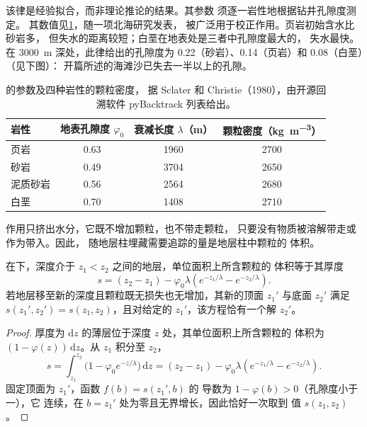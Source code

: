 该律是经验拟合，而非理论推论的结果。其参数
须逐一岩性地根据钻井孔隙度测定。
其数值见\cref{tab:b1:diagenesis-basins:athy}，随一项北海研究发表，
被广泛用于校正作用。页岩初始含水比砂岩多，
但失水的距离较短；白垩在地表处是三者中孔隙度最大的，
失水最快。在 \qty{3000}{m} 深处，此律给出的孔隙度为
\num{0.22}（砂岩）、\num{0.14}（页岩）和 \num{0.08}（白垩）（见下图）：
开篇所述的海滩沙已失去一半以上的孔隙。

\begin{table}[htbp]
\centering
\begin{tabular}{lccc}
\hline
岩性 & 地表孔隙度 $\varphi_0$ & 衰减长度 $\lambda$（m） & 颗粒密度（\unit{kg.m^{-3}}） \\
\hline
页岩            & 0.63 & 1960 & 2700 \\
砂岩            & 0.49 & 3704 & 2650 \\
泥质砂岩        & 0.56 & 2564 & 2680 \\
白垩            & 0.70 & 1408 & 2710 \\
\hline
\end{tabular}
\caption{的参数及四种岩性的颗粒密度，
据 Sclater 和 Christie（1980），由开源回溯软件
pyBacktrack 列表给出。}
\label{tab:b1:diagenesis-basins:athy}
\end{table}

作用只挤出水分，它既不增加颗粒，也不带走颗粒，
只要没有物质被溶解带走或作为带入。因此，
随地层柱埋藏需要追踪的量是地层柱中颗粒的
体积。

\begin{proposition}[地层的固体厚度]\label{prop:b1:diagenesis-basins:solid}
在下，深度介于 $z_1 < z_2$ 之间的地层，单位面积上所含颗粒的
体积等于其厚度
\[
  s = (z_2 - z_1) - \varphi_0 \lambda \left( e^{-z_1/\lambda} - e^{-z_2/\lambda} \right).
\]
若地层移至新的深度且颗粒既无损失也无增加，其新的顶面
$z_1'$ 与底面 $z_2'$ 满足 $s(z_1', z_2') = s(z_1, z_2)$，且对给定的
$z_1'$，该方程恰有一个解 $z_2'$。
\end{proposition}

\begin{proof}
厚度为 $\mathrm dz$ 的薄层位于深度 $z$ 处，其单位面积上所含颗粒的
体积为 $(1 - \varphi(z))\,\mathrm dz$。从 $z_1$ 积分至 $z_2$，
\[
  s = \int_{z_1}^{z_2} \bigl(1 - \varphi_0 e^{-z/\lambda}\bigr)\,\mathrm dz
    = (z_2 - z_1) - \varphi_0\lambda\left(e^{-z_1/\lambda} - e^{-z_2/\lambda}\right).
\]
固定顶面为 $z_1'$，函数 $f(b) = s(z_1', b)$ 的
导数为 $1 - \varphi(b) > 0$（孔隙度小于一），它
连续，在 $b = z_1'$ 处为零且无界增长，因此恰好一次取到
值 $s(z_1, z_2)$。
\end{proof}

